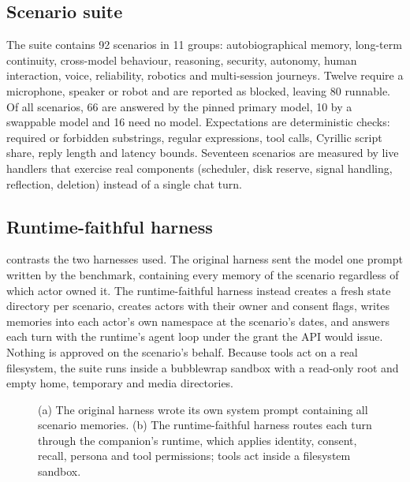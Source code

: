 \documentclass[11pt,a4paper]{article}
\begin{document}
\subsection{Scenario suite}
The suite contains 92 scenarios in 11 groups: autobiographical memory, long-term continuity, cross-model behaviour, reasoning, security, autonomy, human interaction, voice, reliability, robotics and multi-session journeys. Twelve require a microphone, speaker or robot and are reported as blocked, leaving 80 runnable. Of all scenarios, 66 are answered by the pinned primary model, 10 by a swappable model and 16 need no model. Expectations are deterministic checks: required or forbidden substrings, regular expressions, tool calls, Cyrillic script share, reply length and latency bounds. Seventeen scenarios are measured by live handlers that exercise real components (scheduler, disk reserve, signal handling, reflection, deletion) instead of a single chat turn.

\subsection{Runtime-faithful harness}
 contrasts the two harnesses used. The original harness sent the model one prompt written by the benchmark, containing every memory of the scenario regardless of which actor owned it. The runtime-faithful harness instead creates a fresh state directory per scenario, creates actors with their owner and consent flags, writes memories into each actor's own namespace at the scenario's dates, and answers each turn with the runtime's agent loop under the grant the API would issue. Nothing is approved on the scenario's behalf. Because tools act on a real filesystem, the suite runs inside a bubblewrap sandbox with a read-only root and empty home, temporary and media directories.

\begin{figure}[tbp]\centering
\caption{(a) The original harness wrote its own system prompt containing all scenario memories. (b) The runtime-faithful harness routes each turn through the companion's runtime, which applies identity, consent, recall, persona and tool permissions; tools act inside a filesystem sandbox.}\label{fig:harness}\end{figure}
\end{document}
